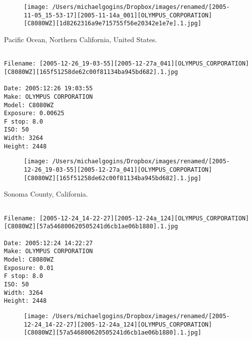 \begin{figure}
\texttt{[image: /Users/michaelgogins/Dropbox/images/renamed/[2005-11-05\_15-53-17][2005-11-14a\_001][OLYMPUS\_CORPORATION][C8080WZ][1d8262316a9e715755f56e20342e1e7e].1.jpg]}
\end{figure}
    
\clearpage
\onecolumn
\noindent Pacific Ocean, Northern California, United States.
\noindent
\begin{lstlisting}

Filename: [2005-12-26_19-03-55][2005-12-27a_041][OLYMPUS_CORPORATION][C8080WZ][165f51258de62c00f81134ba945bd682].1.jpg

Date: 2005:12:26 19:03:55
Make: OLYMPUS CORPORATION
Model: C8080WZ
Exposure: 0.00625
F stop: 8.0
ISO: 50
Width: 3264
Height: 2448
\end{lstlisting}
\clearpage

\begin{figure}
\texttt{[image: /Users/michaelgogins/Dropbox/images/renamed/[2005-12-26\_19-03-55][2005-12-27a\_041][OLYMPUS\_CORPORATION][C8080WZ][165f51258de62c00f81134ba945bd682].1.jpg]}
\end{figure}
    
\clearpage
\onecolumn
\noindent Sonoma County, California.
\noindent
\begin{lstlisting}

Filename: [2005-12-24_14-22-27][2005-12-24a_124][OLYMPUS_CORPORATION][C8080WZ][57a546800620505241d6cb1ae06b1880].1.jpg

Date: 2005:12:24 14:22:27
Make: OLYMPUS CORPORATION
Model: C8080WZ
Exposure: 0.01
F stop: 8.0
ISO: 50
Width: 3264
Height: 2448
\end{lstlisting}
\clearpage

\begin{figure}
\texttt{[image: /Users/michaelgogins/Dropbox/images/renamed/[2005-12-24\_14-22-27][2005-12-24a\_124][OLYMPUS\_CORPORATION][C8080WZ][57a546800620505241d6cb1ae06b1880].1.jpg]}
\end{figure}
    
